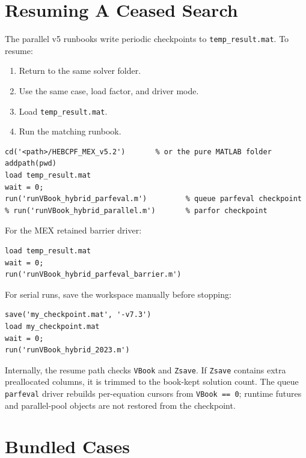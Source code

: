 \documentclass[11pt,a4paper]{article}
\newcommand{\code}[1]{\texttt{#1}}
\begin{document}
\section{Resuming A Ceased Search}

The parallel v5 runbooks write periodic checkpoints to \code{temp_result.mat}. To resume:

\begin{enumerate}[leftmargin=1.6em]
  \item Return to the same solver folder.
  \item Use the same case, load factor, and driver mode.
  \item Load \code{temp_result.mat}.
  \item Run the matching runbook.
\end{enumerate}

\begin{lstlisting}[style=mat]
cd('<path>/HEBCPF_MEX_v5.2')       % or the pure MATLAB folder
addpath(pwd)
load temp_result.mat
wait = 0;
run('runVBook_hybrid_parfeval.m')         % queue parfeval checkpoint
% run('runVBook_hybrid_parallel.m')       % parfor checkpoint
\end{lstlisting}

For the MEX retained barrier driver:

\begin{lstlisting}[style=mat]
load temp_result.mat
wait = 0;
run('runVBook_hybrid_parfeval_barrier.m')
\end{lstlisting}

For serial runs, save the workspace manually before stopping:

\begin{lstlisting}[style=mat]
save('my_checkpoint.mat', '-v7.3')
load my_checkpoint.mat
wait = 0;
run('runVBook_hybrid_2023.m')
\end{lstlisting}

Internally, the resume path checks \code{VBook} and \code{Zsave}. If \code{Zsave} contains
extra preallocated columns, it is trimmed to the book-kept solution count. The queue
\code{parfeval} driver rebuilds per-equation cursors from \code{VBook == 0}; runtime futures and
parallel-pool objects are not restored from the checkpoint.

\section{Bundled Cases}
\end{document}
